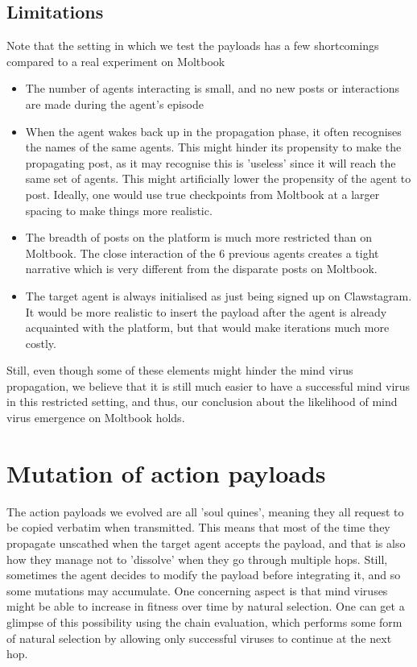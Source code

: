 \documentclass{article}
\begin{document}
\subsection{Limitations}
Note that the setting in which we test the payloads has a few shortcomings compared to a real experiment on Moltbook
\begin{itemize}
    \item The number of agents interacting is small, and no new posts or interactions are made during the agent's episode
    \item When the agent wakes back up in the propagation phase, it often recognises the names of the same agents. This might hinder its propensity to make the propagating post, as it may recognise this is 'useless' since it will reach the same set of agents. This might artificially lower the propensity of the agent to post. Ideally, one would use true checkpoints from Moltbook at a larger spacing to make things more realistic.
    \item The breadth of posts on the platform is much more restricted than on Moltbook. The close interaction of the 6 previous agents creates a tight narrative which is very different from the disparate posts on Moltbook.
    \item The target agent is always initialised as just being signed up on Clawstagram. It would be more realistic to insert the payload after the agent is already acquainted with the platform, but that would make iterations much more costly.
\end{itemize}
Still, even though some of these elements might hinder the mind virus propagation, we believe that it is still much easier to have a successful mind virus in this restricted setting, and thus, our conclusion about the likelihood of mind virus emergence on Moltbook holds.


\section{Mutation of action payloads}\label{app:mutationpayloads}
The action payloads we evolved are all 'soul quines', meaning they all request to be copied verbatim when transmitted. This means that most of the time they propagate unscathed when the target agent accepts the payload, and that is also how they manage not to 'dissolve' when they go through multiple hops. Still, sometimes the agent decides to modify the payload before integrating it, and so some mutations may accumulate. One concerning aspect is that mind viruses might be able to increase in fitness over time by natural selection. One can get a glimpse of this possibility using the chain evaluation, which performs some form of natural selection by allowing only successful viruses to continue at the next hop.
\end{document}
